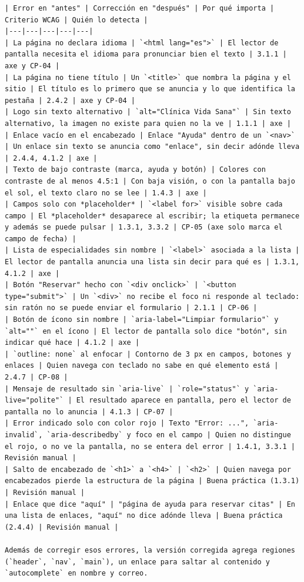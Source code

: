\documentclass[10pt,letterpaper,onecolumn]{IEEEtran}
\begin{document}
\begin{lstlisting}
| Error en "antes" | Corrección en "después" | Por qué importa | Criterio WCAG | Quién lo detecta |
|---|---|---|---|---|
| La página no declara idioma | `<html lang="es">` | El lector de pantalla necesita el idioma para pronunciar bien el texto | 3.1.1 | axe y CP-04 |
| La página no tiene título | Un `<title>` que nombra la página y el sitio | El título es lo primero que se anuncia y lo que identifica la pestaña | 2.4.2 | axe y CP-04 |
| Logo sin texto alternativo | `alt="Clínica Vida Sana"` | Sin texto alternativo, la imagen no existe para quien no la ve | 1.1.1 | axe |
| Enlace vacío en el encabezado | Enlace "Ayuda" dentro de un `<nav>` | Un enlace sin texto se anuncia como "enlace", sin decir adónde lleva | 2.4.4, 4.1.2 | axe |
| Texto de bajo contraste (marca, ayuda y botón) | Colores con contraste de al menos 4.5:1 | Con baja visión, o con la pantalla bajo el sol, el texto claro no se lee | 1.4.3 | axe |
| Campos solo con *placeholder* | `<label for>` visible sobre cada campo | El *placeholder* desaparece al escribir; la etiqueta permanece y además se puede pulsar | 1.3.1, 3.3.2 | CP-05 (axe solo marca el campo de fecha) |
| Lista de especialidades sin nombre | `<label>` asociada a la lista | El lector de pantalla anuncia una lista sin decir para qué es | 1.3.1, 4.1.2 | axe |
| Botón "Reservar" hecho con `<div onclick>` | `<button type="submit">` | Un `<div>` no recibe el foco ni responde al teclado: sin ratón no se puede enviar el formulario | 2.1.1 | CP-06 |
| Botón de ícono sin nombre | `aria-label="Limpiar formulario"` y `alt=""` en el ícono | El lector de pantalla solo dice "botón", sin indicar qué hace | 4.1.2 | axe |
| `outline: none` al enfocar | Contorno de 3 px en campos, botones y enlaces | Quien navega con teclado no sabe en qué elemento está | 2.4.7 | CP-08 |
| Mensaje de resultado sin `aria-live` | `role="status"` y `aria-live="polite"` | El resultado aparece en pantalla, pero el lector de pantalla no lo anuncia | 4.1.3 | CP-07 |
| Error indicado solo con color rojo | Texto "Error: ...", `aria-invalid`, `aria-describedby` y foco en el campo | Quien no distingue el rojo, o no ve la pantalla, no se entera del error | 1.4.1, 3.3.1 | Revisión manual |
| Salto de encabezado de `<h1>` a `<h4>` | `<h2>` | Quien navega por encabezados pierde la estructura de la página | Buena práctica (1.3.1) | Revisión manual |
| Enlace que dice "aquí" | "página de ayuda para reservar citas" | En una lista de enlaces, "aquí" no dice adónde lleva | Buena práctica (2.4.4) | Revisión manual |

Además de corregir esos errores, la versión corregida agrega regiones (`header`, `nav`, `main`), un enlace para saltar al contenido y `autocomplete` en nombre y correo.


\end{lstlisting}
\end{document}

